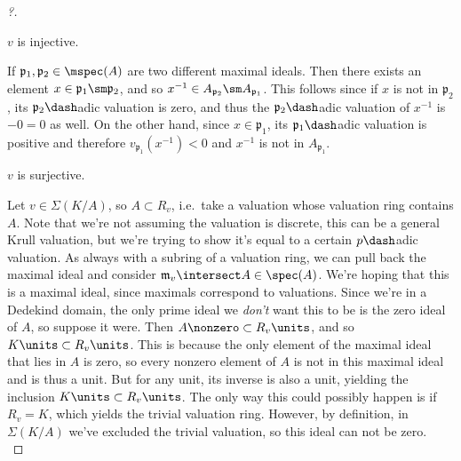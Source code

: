 \begin{proof}[?]

\begin{claim}

\(v\) is injective.

\end{claim}

If \(\mathfrak{p}_1, \mathfrak{p}_2 \in \mspec(A)\) are two different
maximal ideals. Then there exists an element
\(x\in \mathfrak{p}_1 \sm \mathfrak{p}_2\), and so
\(x^{-1} \in A_{\mathfrak{p}_2} \sm A_{\mathfrak{p}_1}\). This follows
since if \(x\) is not in \(\mathfrak{p}_2\), its
\(\mathfrak{p}_2\dash\)adic valuation is zero, and thus the
\(\mathfrak{p}_2\dash\)adic valuation of \(x^{-1}\) is \(-0 = 0\) as
well. On the other hand, since \(x\in \mathfrak{p}_1\), its
\(\mathfrak{p}_1\dash\)adic valuation is positive and therefore
\(v_{\mathfrak{p}_1}(x^{-1}) < 0\) and \(x^{-1}\) is not in
\(A_{\mathfrak{p}_1}\).

\begin{claim}

\(v\) is surjective.

\end{claim}

Let \(v\in \Sigma(K/A)\), so \(A \subset R_v\), i.e.~take a valuation
whose valuation ring contains \(A\). Note that we're not assuming the
valuation is discrete, this can be a general Krull valuation, but we're
trying to show it's equal to a certain \(p\dash\)adic valuation. As
always with a subring of a valuation ring, we can pull back the maximal
ideal and consider \(\mathfrak{m}_v \intersect A \in \spec(A)\). We're
hoping that this is a maximal ideal, since maximals correspond to
valuations. Since we're in a Dedekind domain, the only prime ideal we
\emph{don't} want this to be is the zero ideal of \(A\), so suppose it
were. Then \(A\nonzero \subset R_v\units\), and so
\(K\units \subset R_v\units\). This is because the only element of the
maximal ideal that lies in \(A\) is zero, so every nonzero element of
\(A\) is not in this maximal ideal and is thus a unit. But for any unit,
its inverse is also a unit, yielding the inclusion
\(K\units \subset R_v\units\). The only way this could possibly happen
is if \(R_v = K\), which yields the trivial valuation ring. However, by
definition, in \(\Sigma(K/A)\) we've excluded the trivial valuation, so
this ideal can not be zero.\\


\end{proof}
